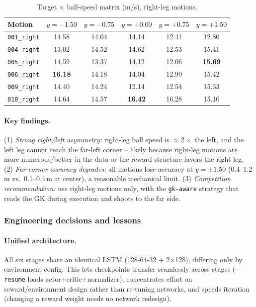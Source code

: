 \documentclass{article}
\newcommand{\code}[1]{\texttt{#1}}
\begin{document}
\begin{table}[h]
\centering\small
\caption{Target $\times$ ball-speed matrix (m/s), right-leg motions.}
\begin{tabular}{@{}lccccc@{}}
\toprule
Motion & $y{=}{-}1.50$ & $y{=}{-}0.75$ & $y{=}{+}0.00$ & $y{=}{+}0.75$ & $y{=}{+}1.50$ \\
\midrule
\code{001_right} & 14.58 & 14.04 & 14.14 & 12.41 & 12.80 \\
\code{004_right} & 13.02 & 14.52 & 14.62 & 12.53 & 15.41 \\
\code{005_right} & 14.59 & 13.37 & 14.12 & 12.06 & \textbf{15.69} \\
\code{006_right} & \textbf{16.18} & 14.18 & 14.04 & 12.99 & 15.42 \\
\code{009_right} & 14.40 & 14.24 & 12.14 & 12.54 & 15.33 \\
\code{010_right} & 14.64 & 14.57 & \textbf{16.42} & 16.28 & 15.10 \\
\bottomrule
\end{tabular}
\end{table}

\paragraph{Key findings.} (1) \emph{Strong right/left asymmetry:} right-leg ball
speed is $\approx2\times$ the left, and the left leg cannot reach the far-left
corner -- likely because right-leg motions are more numerous/better in the data
or the reward structure favors the right leg. (2) \emph{Far-corner accuracy
degrades:} all motions lose accuracy at $y=\pm1.50$ (0.4--1.2\,m vs.\ 0.1--0.4\,m
at center), a reasonable mechanical limit. (3) \emph{Competition recommendation:}
use right-leg motions only, with the \code{gk-aware} strategy that reads the GK
during execution and shoots to the far side.

\subsubsection{Engineering decisions and lessons}\label{sec:sh-engineering}

\paragraph{Unified architecture.} All six stages share an identical LSTM
(128-64-32 $+$ 2$\times$128), differing only by environment config. This lets
checkpoints transfer seamlessly across stages (\code{--resume} loads
actor$+$critic$+$normalizer), concentrates effort on reward/environment design
rather than re-tuning networks, and speeds iteration (changing a reward weight
needs no network redesign).
\end{document}
